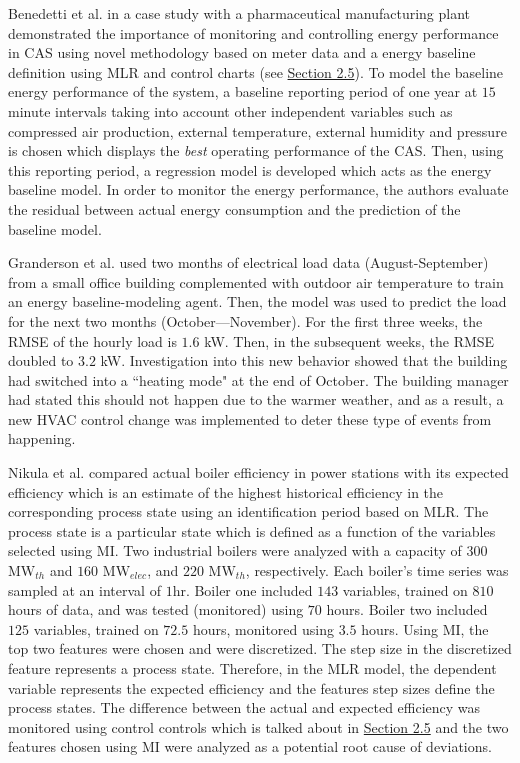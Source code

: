 Benedetti et al. \cite{cas} in a case study with a pharmaceutical manufacturing plant demonstrated the importance of monitoring and controlling energy performance in \ac{CAS} using novel methodology based on meter data and a energy baseline definition using MLR and control charts (see \hyperlink{subsection.2.5}{Section 2.5}). To model the baseline energy performance of the system, a baseline reporting period of one year at $15$ minute intervals taking into account other independent variables such as compressed air production, external temperature, external humidity and pressure is chosen which displays the \textit{best} operating performance of the CAS. Then, using this reporting period, a regression model is developed which acts as the energy baseline model. In order to monitor the energy performance, the authors evaluate the residual between actual energy consumption and the prediction of the baseline model. 

Granderson et al. \cite{lawrence-lab} used two months of electrical load data (August-September) from a small office building complemented with outdoor air temperature to train an energy baseline-modeling agent. Then, the model was used to predict the load for the next two months (October—November). For the first three weeks, the \ac{RMSE} of the hourly load is $1.6$ \ac{kW}. Then, in the subsequent weeks, the RMSE doubled to $3.2$ kW. Investigation into this new behavior showed that the building had switched into a ``heating mode" at the end of October. The building manager had stated this should not happen due to the warmer weather, and as a result, a new \ac{HVAC} control change was implemented to deter these type of events from happening. 

Nikula et al.\cite{boiler} compared actual boiler efficiency in power stations with its expected efficiency which is an estimate of the highest historical efficiency in the corresponding process state using an identification period based on MLR. The process state is a particular state which is defined as a function of the variables selected using \ac{MI}. Two industrial boilers were analyzed with a capacity of $300$ $\text{MW}_{th}$ and $160$ $\text{MW}_{elec}$, and $220$ $\text{MW}_{th}$, respectively. Each boiler's time series was sampled at an interval of $1$hr. Boiler one included $143$ variables, trained on $810$ hours of data, and was tested (monitored) using $70$ hours. Boiler two included $125$ variables, trained on $72.5$ hours, monitored using $3.5$ hours. Using MI, the top two features were chosen and were discretized. The step size in the discretized feature represents a process state. Therefore, in the MLR model, the dependent variable represents the expected efficiency and the features step sizes define the process states. The difference between the actual and expected efficiency was monitored using control controls which is talked about in \hyperlink{subsection.2.5}{Section 2.5} and the two features chosen using MI were analyzed as a potential root cause of deviations.

